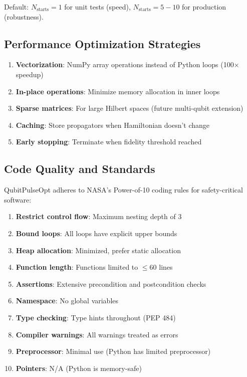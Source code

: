 \documentclass[11pt,a4paper]{article}
\theoremstyle{definition}
\theoremstyle{remark}
\begin{document}
Default: $N_{\text{starts}} = 1$ for unit tests (speed), $N_{\text{starts}} = 5-10$ for production (robustness).

\subsection{Performance Optimization Strategies}

\begin{enumerate}
    \item \textbf{Vectorization}: NumPy array operations instead of Python loops (100× speedup)
    \item \textbf{In-place operations}: Minimize memory allocation in inner loops
    \item \textbf{Sparse matrices}: For large Hilbert spaces (future multi-qubit extension)
    \item \textbf{Caching}: Store propagators when Hamiltonian doesn't change
    \item \textbf{Early stopping}: Terminate when fidelity threshold reached
\end{enumerate}

\subsection{Code Quality and Standards}

QubitPulseOpt adheres to NASA's Power-of-10 coding rules for safety-critical software:

\begin{enumerate}
    \item \textbf{Restrict control flow}: Maximum nesting depth of 3
    \item \textbf{Bound loops}: All loops have explicit upper bounds
    \item \textbf{Heap allocation}: Minimized, prefer static allocation
    \item \textbf{Function length}: Functions limited to $\leq 60$ lines
    \item \textbf{Assertions}: Extensive precondition and postcondition checks
    \item \textbf{Namespace}: No global variables
    \item \textbf{Type checking}: Type hints throughout (PEP 484)
    \item \textbf{Compiler warnings}: All warnings treated as errors
    \item \textbf{Preprocessor}: Minimal use (Python has limited preprocessor)
    \item \textbf{Pointers}: N/A (Python is memory-safe)
\end{enumerate}
\end{document}
